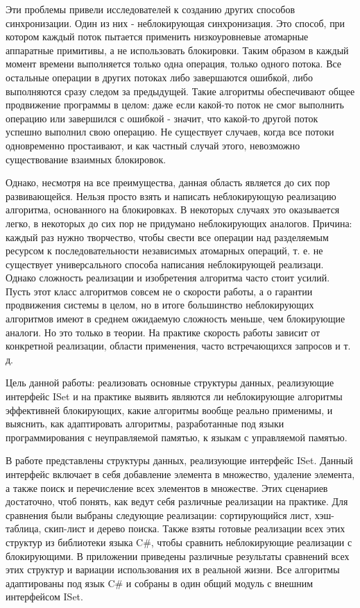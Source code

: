 \documentclass[12pt]{article}
\begin{document}
{			\par Эти проблемы привели исследователей к созданию других способов синхронизации. Один из них - неблокирующая синхронизация. Это способ, при котором каждый поток пытается применить низкоуровневые атомарные аппаратные примитивы, а не использовать блокировки. Таким образом в каждый момент времени выполняется только одна операция, только одного потока. Все остальные операции в других потоках либо завершаются ошибкой, либо выполняются сразу следом за предыдущей. Такие алгоритмы обеспечивают общее продвижение программы в целом: даже если какой-то поток не смог выполнить операцию или завершился с ошибкой - значит, что какой-то другой поток успешно выполнил свою операцию. Не существует случаев, когда все потоки одновременно простаивают, и как частный случай этого, невозможно существование взаимных блокировок. 
			\par Однако, несмотря на все преимущества, данная область является до сих пор развивающейся. Нельзя просто взять и написать неблокирующую реализацию алгоритма, основанного на блокировках. В некоторых случаях это оказывается легко, в некоторых до сих пор не придумано неблокирующих аналогов. Причина: каждый раз нужно творчество, чтобы свести все операции над разделяемым ресурсом к последовательности независимых атомарных операций, т. е. не существует универсального способа написания неблокирующей реализаци. Однако сложность реализации и изобретения алгоритма часто стоит усилий. Пусть этот класс алгоритмов совсем не о скорости работы, а о гарантии продвижения системы в целом, но в итоге большинство неблокирующих алгоритмов имеют в среднем ожидаемую сложность меньше, чем блокирующие аналоги. Но это только в теории. На практике скорость работы зависит от конкретной реализации, области применения, часто встречающихся запросов и т. д.
			\par Цель данной работы: реализовать основные структуры данных, реализующие интерфейс ISet и на практике выявить являются ли неблокирующие алгоритмы эффективней блокирующих, какие алгоритмы вообще реально применимы, и выяснить, как адаптировать алгоритмы, разработанные под языки программирования с неуправляемой памятью, к языкам с управляемой памятью.
			\par В работе представлены структуры данных, реализующие интерфейс ISet. Данный интерфейс включает в себя добавление элемента в множество, удаление элемента, а также поиск и перечисление всех элементов в множестве. Этих сценариев достаточно, чтоб понять, как ведут себя различные реализации на практике. Для сравнения были выбраны следующие реализации: сортирующийся лист, хэш-таблица, скип-лист и дерево поиска. Также взяты готовые реализации всех этих структур из библиотеки языка C\#, чтобы сравнить неблокирующие реализации с блокирующими. В приложении приведены различные результаты сравнений всех этих структур и вариации использования их в реальной жизни. Все алгоритмы адаптированы под язык C\# и собраны в один общий модуль с внешним интерфейсом ISet.
		
}
\end{document}
